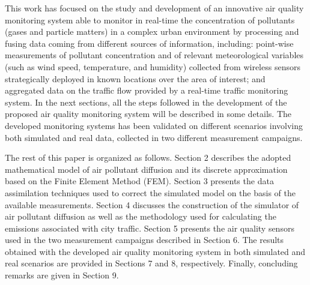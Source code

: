 \documentclass[journal]{IEEEtran}
\begin{document}
This work has focused on the
study and development of an innovative air quality monitoring system able to monitor in real-time the concentration of
pollutants (gases and particle matters) in a complex urban environment by processing and fusing data coming from
different sources of information, including: point-wise measurements of pollutant concentration and of relevant
meteorological variables (such as wind speed, temperature, and humidity) collected from wireless sensors strategically
deployed in known locations over the area of interest; and aggregated data on the traffic flow provided by a real-time
traffic monitoring system. In the next sections, all the steps followed in the development of the proposed air quality monitoring system will be
described in some details. The developed monitoring systems has been validated on different scenarios involving both simulated and real data,
collected in two different measurement campaigns.

The rest of this paper is organized as follows.  Section 2 describes the adopted mathematical model of air pollutant diffusion and its discrete approximation based on the 
Finite Element Method (FEM). Section 3 presents the data assimilation techniques used to correct the simulated model on the basis of the available measurements.
Section 4 discusses the construction of the simulator of air pollutant diffusion as well as the methodology used for calculating the emissions associated with city traffic.
Section 5 presents the air quality sensors used in the two measurement campaigns described in Section 6. 
The results obtained with the developed air quality monitoring system in both simulated and real scenarios are provided in Sections 7 and 8, respectively.
Finally, concluding remarks are given in Section 9.

% 
% 
% 
% 
%
% 
%
\end{document}
